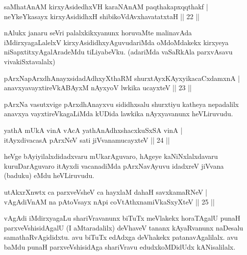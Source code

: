 \begin{shl}
saMhatAnAM kirxyAsidedhxVH karaNAnAM paqthakapxqqthakf | \\
neYkeYkasayx kirxyAsididhxH shibikoVdAvxhavatatxtaH \hfill|| 22 || 
\end{shl}

\begin{artha}
nAlukx janaru seVri palalxkikxyanunx horuvaMte malinavAda 
iMdirxyagaLalelxV kirxyAsididhxyAguvudariMda oMdoMdakekx kirxyeya 
niSapxtitxyAgalAradeMdu \-tiLiyabeVku. (adariMda vaSaRkAla parxvAsavu 
vivakiSxtavalalx)
\end{artha}

\begin{shl}
pArxNapArxdhAnayxsidadAdhxyXthaRM shurxtAyx\s \s KAyxyikacaCxdamxnA | \\
anavxyavayxtireVkABAyxM nAyxyoV lwkika ucayxteV \hfill|| 23 || 
\end{shl}

\begin{artha}
pArxNa vasutxvige pArxdhAnayxvu sididhxsalu shurxtiyu katheya nepadalilx anavxya vayxtireVkagaLiMda kUDida lawkika nAyxyavanunx heVLiruvudu.
\end{artha}


\begin{shl}
yathA mUkA vinA vAcA yathA\s nAdhxshacxkuSxSA vinA | \\
itAyxdivacasA pArxNeV sati jiVvanamucayxteV \hfill|| 24 || 
\end{shl}

\begin{artha}
heVge bAyiyilalxdidadxvaru mUkarAguvaro, hAgeye kaNiNxlalxdavaru kuruDarAguvaro itAyxdi vacanadiMda pArxNavAyuvu idadxreV jiVvana (baduku) eMdu heVLiruvudu.
\end{artha}

\begin{shl}
utAkxrXnwtx ca parxveVsheV ca hayxlaM dahaH savxkamaRNeV | \\
vAgAdiVnAM na pAtoV\s sayx nApi coVtAthxnamiVkaSxyXteV \hfill|| 25 || 
\end{shl}

\begin{artha}
vAgAdi iMdirxyagaLu shariVravanunx biTuTx meVlakekx horaTAgalU punaH parxveVshisidAgalU (I aMtaradalilx) deVhaveV tananx kAyaRvanunx naDesalu samathaRvAgididxtu. avu biTuTx edAdxga deVhakekx patanavAgalilalx. avu baMdu punaH parxveVshisidAga shariVravu edudxkoMDidUdx kANisalilalx.
\end{artha}

